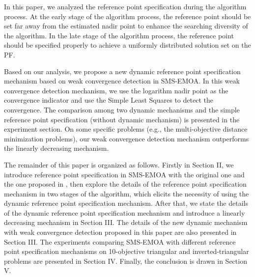 \documentclass[conference]{IEEEtran}
\begin{document}
In this paper, we analyzed the reference point specification during the algorithm process.
At the early stage of the algorithm process, 
the reference point should be set far away from the estimated nadir point to enhance the searching diversity of the algorithm. 
In the late stage of the algorithm process, 
the reference point should be specified properly to achieve a uniformly distributed solution set on the PF.

Based on our analysis, we propose a new dynamic reference point specification mechanism based on weak convergence detection in SMS-EMOA. 
In this weak convergence detection mechanism, we use the logarithm nadir point as the convergence indicator
and use the Simple Least Squares\cite{SimpleLeastSquares} to detect the convergence. 
The comparison among two dynamic mechanisms and the simple reference point specification (without dynamic mechanism) is 
presented in the experiment section. On some specific problems (e.g., the multi-objective distance minimization problems\cite{dmp}), 
our weak convergence detection mechanism outperforms the linearly decreasing mechanism. 

The remainder of this paper is organized as follows. 
Firstly in Section II, we introduce reference point specification in SMS-EMOA with
the original one and the one proposed in \cite{hisao:RPhowtoSpecify},
then explore the details of the reference point specification mechanism in two stages of the algorithm, 
which elicits the necessity of using the dynamic reference point specification mechanism.
After that, we state the details of the dynamic reference point specification mechanism and introduce 
a linearly decreasing mechanism in Section III. 
The details of the new dynamic mechanism with weak convergence detection proposed in this paper are also presented in Section III. 
The experiments comparing SMS-EMOA with different reference point specification mechanisms 
on 10-objective triangular and inverted-triangular problems are presented in Section IV. 
Finally, the conclusion is drawn in Section V.

%
%
\end{document}
